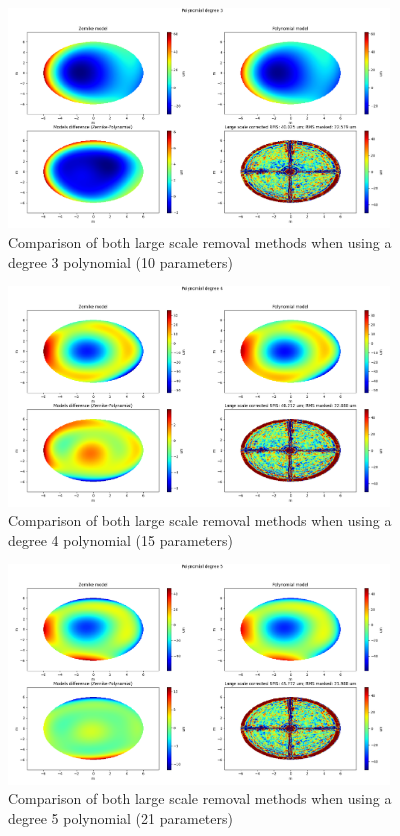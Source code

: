 \begin{figure}
    \centering
    \includegraphics[width=0.9\textwidth]{images/large_scale_comp_3.png}
    \caption{Comparison of both large scale removal methods when using a degree 3 polynomial (10 parameters)}
    \label{fig:large_scale_comp_3}
\end{figure}



\begin{figure}
    \centering
    \includegraphics[width=0.9\textwidth]{images/large_scale_comp_4.png}
    \caption{Comparison of both large scale removal methods when using a degree 4 polynomial (15 parameters)}
    \label{fig:large_scale_comp_4}
\end{figure}


\begin{figure}
    \centering
    \includegraphics[width=0.9\textwidth]{images/large_scale_comp_5.png}
    \caption{Comparison of both large scale removal methods when using a degree 5 polynomial (21 parameters)}
    \label{fig:large_scale_comp_5}
\end{figure}









